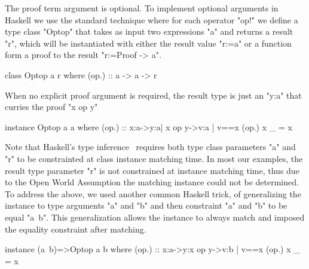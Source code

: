 %
The proof term argument is optional.
To implement optional arguments in Haskell we use the standard technique
where for each operator "op!" we define a type class "Optop"
that takes as input two expressions "a" and returns a result "r",
which will be instantiated with either the result value "r:=a"
or a function form a proof to the result "r:=Proof ->  a".
%
\begin{code}
  class Optop a r where
    (op.) :: a -> a -> r
\end{code}
%
When no explicit proof argument is required,
the result type is just an "y:a" that curries the proof "x op y"
%
\begin{code}
  instance Optop a a where
  (op.) :: x:a->y:{a| x op y}->{v:a | v==x }
  (op.) x _ = x
\end{code}
%
Note that Haskell's type inference~\citep{Sulzmann06}
requires both type class parameters "a" and "r" to be constrainted at class instance
matching time.
%
In most our examples, the result type parameter "r" is not constrained
at instance matching time, thus
due to the Open World Assumption
the matching instance could not be determined.
%
To address the above, we used another common Haskell trick,
of generalizing the instance to type arguments "a" and "b" and then
constraint "a" and "b" to be equal "a~b".
%
This generalization allows the instance to always match and
imposed the equality constraint after matching.
%
\begin{code}
  instance (a~b)=>Optop a b where
  (op.) :: x:a->y:{x op y}->{v:b | v==x }
  (op.) x _ = x
\end{code}


